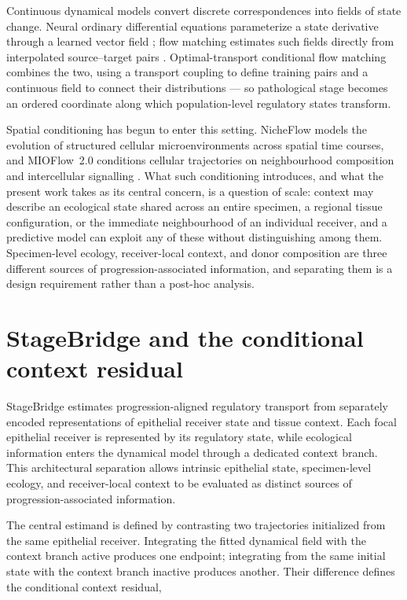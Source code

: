 Continuous dynamical models convert discrete correspondences into fields of
state change. Neural ordinary differential equations parameterize a state
derivative through a learned vector field \autocite{Chen_undated-rf}; flow
matching estimates such fields directly from interpolated source--target
pairs \autocite{Tong2020-ou,Huguet2022-pz,Lipman2022-ns}. Optimal-transport
conditional flow matching combines the two, using a transport coupling to
define training pairs and a continuous field to connect their distributions
\autocite{Klein2025-sr,Richter2026-ib} --- so pathological stage becomes an
ordered coordinate along which population-level regulatory states transform.

Spatial conditioning has begun to enter this setting. NicheFlow models the
evolution of structured cellular microenvironments across spatial time
courses, and MIOFlow~2.0 conditions cellular trajectories on neighbourhood
composition and intercellular signalling \autocite{Sakalyan2025-ia,Sun2026-xk}.
What such conditioning introduces, and what the present work takes as its
central concern, is a question of scale: context may describe an ecological
state shared across an entire specimen, a regional tissue configuration, or
the immediate neighbourhood of an individual receiver, and a predictive model
can exploit any of these without distinguishing among them. Specimen-level
ecology, receiver-local context, and donor composition are three different
sources of progression-associated information, and separating them is a
design requirement rather than a post-hoc analysis.

\section{StageBridge and the conditional context residual}
\label{sec:intro-estimand}

StageBridge estimates progression-aligned regulatory transport from
separately encoded representations of epithelial receiver state and tissue
context. Each focal epithelial receiver is represented by its regulatory
state, while ecological information enters the dynamical model through a
dedicated context branch. This architectural separation allows intrinsic
epithelial state, specimen-level ecology, and receiver-local context to be
evaluated as distinct sources of progression-associated information.

The central estimand is defined by contrasting two trajectories initialized
from the same epithelial receiver. Integrating the fitted dynamical field
with the context branch active produces one endpoint; integrating from the
same initial state with the context branch inactive produces another. Their
difference defines the conditional context residual,

